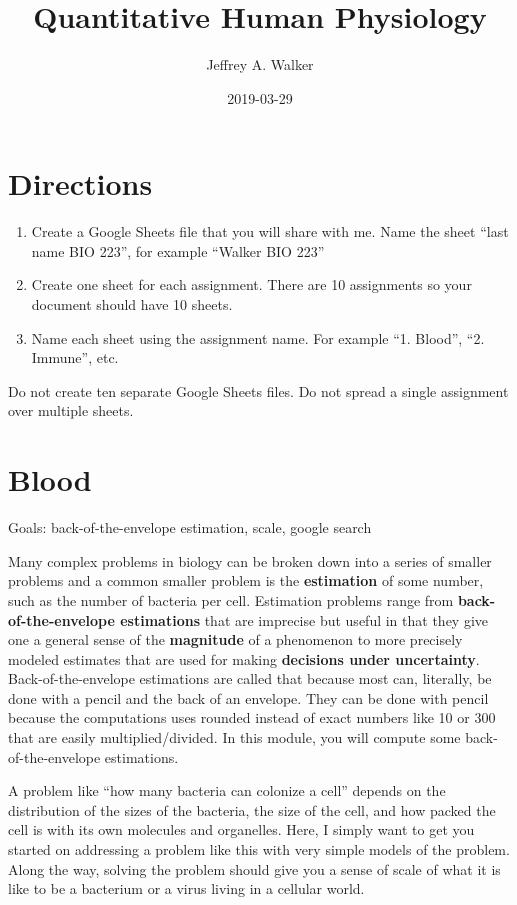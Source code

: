 \documentclass[]{book}
\title{Quantitative Human Physiology}
\author{Jeffrey A. Walker}
\date{2019-03-29}
\begin{document}
\maketitle

{
\setcounter{tocdepth}{1}
\tableofcontents
}
\chapter*{Directions}\label{directions}

\begin{enumerate}
\def\labelenumi{\arabic{enumi}.}
\item
  Create a Google Sheets file that you will share with me. Name the
  sheet ``last name BIO 223'', for example ``Walker BIO 223''
\item
  Create one sheet for each assignment. There are 10 assignments so your
  document should have 10 sheets.
\item
  Name each sheet using the assignment name. For example ``1. Blood'',
  ``2. Immune'', etc.
\end{enumerate}

Do not create ten separate Google Sheets files. Do not spread a single
assignment over multiple sheets.

\chapter{Blood}\label{blood}

Goals: back-of-the-envelope estimation, scale, google search

Many complex problems in biology can be broken down into a series of
smaller problems and a common smaller problem is the \textbf{estimation}
of some number, such as the number of bacteria per cell. Estimation
problems range from \textbf{back-of-the-envelope estimations} that are
imprecise but useful in that they give one a general sense of the
\textbf{magnitude} of a phenomenon to more precisely modeled estimates
that are used for making \textbf{decisions under uncertainty}.
Back-of-the-envelope estimations are called that because most can,
literally, be done with a pencil and the back of an envelope. They can
be done with pencil because the computations uses rounded instead of
exact numbers like 10 or 300 that are easily multiplied/divided. In this
module, you will compute some back-of-the-envelope estimations.

A problem like ``how many bacteria can colonize a cell'' depends on the
distribution of the sizes of the bacteria, the size of the cell, and how
packed the cell is with its own molecules and organelles. Here, I simply
want to get you started on addressing a problem like this with very
simple models of the problem. Along the way, solving the problem should
give you a sense of scale of what it is like to be a bacterium or a
virus living in a cellular world.
\end{document}
